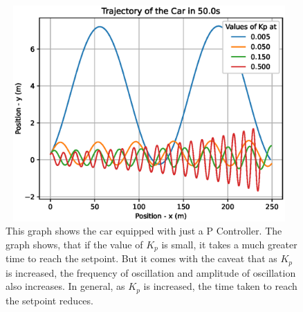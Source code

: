 \documentclass[10pt]{article}
\begin{document}
\begin{figure}
\centering
\includegraphics[width=11cm, height=8.25cm]{q2_1_trajectory.eps}
\caption
{This graph shows the car equipped with just a P Controller. The graph shows, that if the value of $K_p$ is small, it takes a much greater time to reach the setpoint. But it comes with the caveat that as $K_p$ is increased, the frequency of oscillation and amplitude of oscillation also increases. In general, as $K_p$ is increased, the time taken to reach the setpoint reduces.}
\end{figure}
\end{document}
